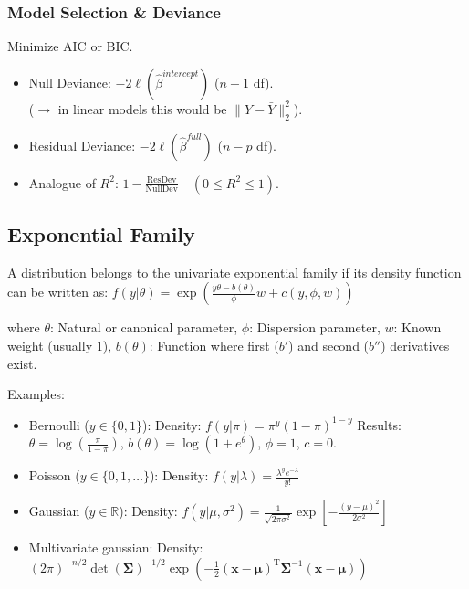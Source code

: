 \subsubsection*{Model Selection \& Deviance}
Minimize AIC or BIC.
\begin{itemize}
    \item Null Deviance: $-2\ell(\hat{\beta}^{intercept})$ ($n-1$ df).
    \\ ($\to$ in linear models this would be $\|Y - \bar{Y}\|_2^2$).
    \item Residual Deviance: $-2\ell(\hat{\beta}^{full})$ ($n-p$ df).
    \item Analogue of $R^2$: $1 - \frac{\text{ResDev}}{\text{NullDev}} \quad (0 \leq R^2 \leq 1)$.
\end{itemize}

\subsection{Exponential Family}
A distribution belongs to the univariate exponential family if its density function can be written as:
$ f(y|\theta) = \exp \left( \frac{y\theta - b(\theta)}{\phi}w + c(y, \phi, w) \right) $

where $\theta$: Natural or canonical parameter, $\phi$: Dispersion parameter, $w$: Known weight (usually 1), $b(\theta)$: Function where first ($b'$) and second ($b''$) derivatives exist.

Examples:
\begin{itemize}
    \item Bernoulli ($y \in \{0,1\}$):
    Density: $f(y|\pi) = \pi^y(1-\pi)^{1-y}$
    Results: $\theta = \log(\frac{\pi}{1-\pi})$, \quad $b(\theta) = \log(1+e^\theta)$, \quad $\phi=1$, \quad $c=0$.

    \item Poisson ($y \in \{0,1,\dots\}$):
    Density: $f(y|\lambda) = \frac{\lambda^y e^{-\lambda}}{y!}$ 

    \item Gaussian ($y \in \mathbb{R}$):
    Density: $f(y|\mu, \sigma^2) = \frac{1}{\sqrt{2\pi\sigma^2}} \exp \left[ -\frac{(y-\mu)^2}{2\sigma^2} \right]$
    \item Multivariate gaussian:
    Density: $(2\pi)^{-n/2} \det(\boldsymbol{\Sigma})^{-1/2} \exp \left( -\frac{1}{2} (\mathbf{x} - \boldsymbol{\mu})^\mathrm{T} \boldsymbol{\Sigma}^{-1} (\mathbf{x} - \boldsymbol{\mu}) \right)$
\end{itemize}